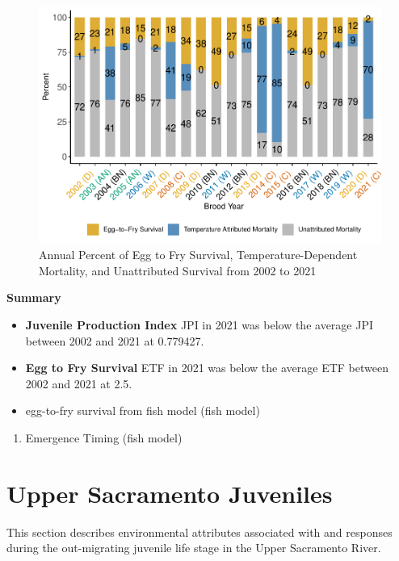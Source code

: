 \documentclass[
]{book}
\providecommand{\tightlist}{%
  \setlength{\itemsep}{0pt}\setlength{\parskip}{0pt}}
\theoremstyle{definition}
\theoremstyle{definition}
\theoremstyle{definition}
\theoremstyle{definition}
\theoremstyle{remark}
\begin{document}
\begin{figure}
\centering
\includegraphics{_main_files/figure-latex/TDM-etf-fig-1.pdf}
\caption{\label{fig:TDM-etf-fig}Annual Percent of Egg to Fry Survival, Temperature-Dependent Mortality, and Unattributed Survival from 2002 to 2021}
\end{figure}

\textbf{Summary}

\begin{itemize}
\item
  \textbf{Juvenile Production Index} JPI in 2021 was below the average JPI between 2002 and 2021 at 0.779427.
\item
  \textbf{Egg to Fry Survival} ETF in 2021 was below the average ETF between 2002 and 2021 at 2.5.
\item
  egg-to-fry survival from fish model (fish model)
\end{itemize}

\begin{enumerate}
\def\labelenumi{\arabic{enumi}.}
\setcounter{enumi}{2}
\tightlist
\item
  Emergence Timing (fish model)
\end{enumerate}

\hypertarget{upper-sacramento-juveniles}{%
\chapter{Upper Sacramento Juveniles}\label{upper-sacramento-juveniles}}

This section describes environmental attributes associated with and responses during the out-migrating juvenile life stage in the Upper Sacramento River.
\end{document}
